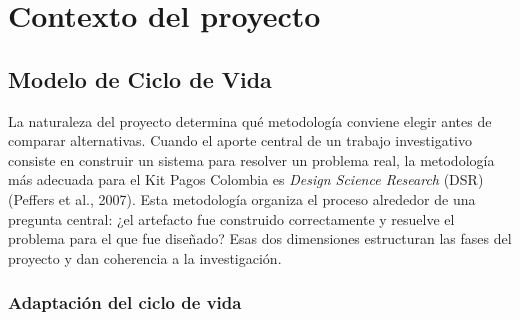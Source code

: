 \section{Contexto del proyecto}

\subsection{Modelo de Ciclo de Vida}

La naturaleza del proyecto determina qué metodología conviene elegir antes de comparar alternativas. Cuando el aporte central de un trabajo investigativo consiste en construir un sistema para resolver un problema real, la metodología más adecuada para el Kit Pagos Colombia es \textit{Design Science Research} (DSR) (Peffers et al., 2007). Esta metodología organiza el proceso alrededor de una pregunta central: ¿el artefacto fue construido correctamente y resuelve el problema para el que fue diseñado? Esas dos dimensiones estructuran las fases del proyecto y dan coherencia a la investigación.

\setcounter{subsubsection}{1}
\subsubsection{Adaptación del ciclo de vida}

